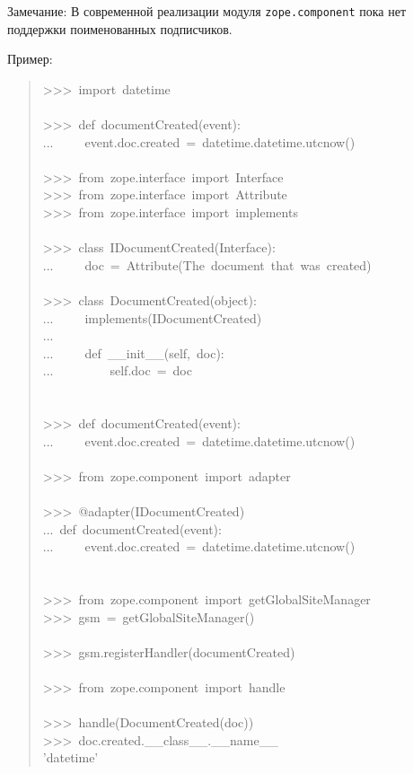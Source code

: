 \documentclass[a4paper,openany,twoside,final]{book}
\begin{document}
Замечание: В современной реализации модуля \texttt{zope.component} пока нет
поддержки поименованных подписчиков.

Пример:

\begin{quote}{\ttfamily \raggedright \noindent
>{}>{}>~import~datetime\\
~\\
>{}>{}>~def~documentCreated(event):\\
...~~~~~event.doc.created~=~datetime.datetime.utcnow()\\
~\\
>{}>{}>~from~zope.interface~import~Interface\\
>{}>{}>~from~zope.interface~import~Attribute\\
>{}>{}>~from~zope.interface~import~implements\\
~\\
>{}>{}>~class~IDocumentCreated(Interface):\\
...~~~~~doc~=~Attribute(\textquotedbl{}The~document~that~was~created\textquotedbl{})\\
~\\
>{}>{}>~class~DocumentCreated(object):\\
...~~~~~implements(IDocumentCreated)\\
...\\
...~~~~~def~\_\_init\_\_(self,~doc):\\
...~~~~~~~~~self.doc~=~doc\\
~\\
~\\
>{}>{}>~def~documentCreated(event):\\
...~~~~~event.doc.created~=~datetime.datetime.utcnow()\\
~\\
>{}>{}>~from~zope.component~import~adapter\\
~\\
>{}>{}>~@adapter(IDocumentCreated)\\
...~def~documentCreated(event):\\
...~~~~~event.doc.created~=~datetime.datetime.utcnow()\\
~\\
~\\
>{}>{}>~from~zope.component~import~getGlobalSiteManager\\
>{}>{}>~gsm~=~getGlobalSiteManager()\\
~\\
>{}>{}>~gsm.registerHandler(documentCreated)\\
~\\
>{}>{}>~from~zope.component~import~handle\\
~\\
>{}>{}>~handle(DocumentCreated(doc))\\
>{}>{}>~doc.created.\_\_class\_\_.\_\_name\_\_\\
'datetime'
}
\end{quote}
\end{document}

